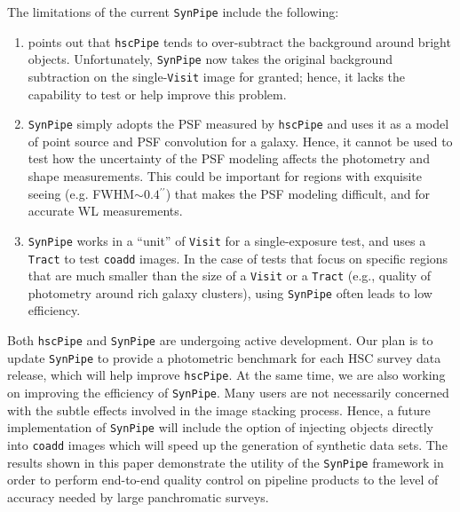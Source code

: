 \documentclass[useamsfonts]{pasj01}
\def\asec{$^{\prime\prime}$}
\def\hscpipe{\texttt{hscPipe}}
\def\synpipe{\texttt{SynPipe}}
\def\coadd{\texttt{coadd}}
\def\tract{\texttt{Tract}}
\def\visit{\texttt{Visit}}
\begin{document}
    The limitations of the current \synpipe{} include the following:

    \begin{enumerate}

        \item \citet{HSCDR1} points out that \hscpipe{} tends to over-subtract the
            background around bright objects.
            Unfortunately, \synpipe{} now takes the original background subtraction on
            the single-\visit{} image for granted; hence, it lacks the capability to
            test or help improve this problem.

        \item  \synpipe{} simply adopts the PSF measured by \hscpipe{} and
            uses it as a model of point source and PSF convolution for a galaxy.
            Hence, it cannot be used to test how the uncertainty of the PSF modeling
            affects the photometry and shape measurements.
            This could be important for regions with exquisite seeing 
            (e.g. FWHM${\sim}0.4$\asec{}) that makes the
            PSF modeling difficult, and for accurate WL measurements.

        \item \synpipe{} works in a ``unit'' of \visit{} for a single-exposure
            test, and uses a \tract{} to test \coadd{} images.
            In the case of tests that focus on specific regions that are much smaller 
            than the size of a \visit{} or a \tract{} (e.g., quality of photometry
            around rich galaxy clusters), using \synpipe{} often leads to
            low efficiency.

    \end{enumerate}

    Both \hscpipe{} and \synpipe{} are undergoing active development. 
    Our plan is to update \synpipe{} to provide a photometric benchmark for
    each HSC survey data release, which will help improve \hscpipe{}.
    At the same time, we are also working on improving the efficiency of \synpipe{}.
    Many users are not necessarily concerned with the subtle effects involved in 
    the image stacking process. Hence, a future implementation of \synpipe{} will include the option of injecting objects directly into  \coadd{} images which will speed up the generation of synthetic data sets. The results shown in this paper demonstrate the  utility of the \synpipe{} framework in order to perform end-to-end quality control on pipeline products to the level of accuracy needed by large panchromatic surveys. 
\end{document}
